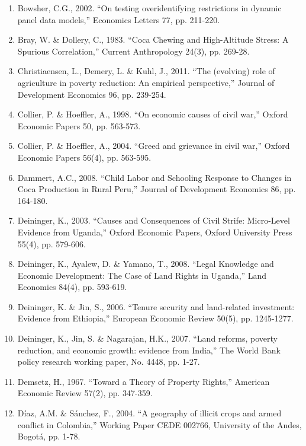\documentclass[12pt,a4paper,english]{article}%
\begin{document}
\begin{enumerate}
\item Bowsher, C.G., 2002. ``On testing overidentifying restrictions in dynamic panel data models,'' Economics Letters 77, pp. 211-220.

\item Bray, W. \& Dollery, C., 1983. ``Coca Chewing and High-Altitude Stress: A Spurious Correlation,'' Current Anthropology 24(3), pp. 269-28.

\item Christiaensen, L., Demery, L. \& Kuhl, J., 2011. ``The (evolving) role of agriculture in poverty reduction: An empirical perspective,'' Journal of Development Economics 96, pp. 239-254.

\item Collier, P. \& Hoeffler, A., 1998. ``On economic causes of civil war,'' Oxford Economic Papers 50, pp. 563-573.

\item Collier, P. \& Hoeffler, A., 2004. ``Greed and grievance in civil war,'' Oxford Economic Papers 56(4), pp. 563-595.

\item Dammert, A.C., 2008. ``Child Labor and Schooling Response to Changes in Coca Production in Rural Peru,'' Journal of Development Economics 86, pp. 164-180.

\item Deininger, K., 2003. ``Causes and Consequences of Civil Strife: Micro-Level Evidence from Uganda,'' Oxford Economic Papers, Oxford University Press 55(4), pp. 579-606.

\item Deininger, K., Ayalew, D. \& Yamano, T., 2008. ``Legal Knowledge and Economic Development: The Case of Land Rights in Uganda,'' Land Economics 84(4), pp. 593-619.

\item Deininger, K. \& Jin, S., 2006. ``Tenure security and land-related investment: Evidence from Ethiopia,'' European Economic Review 50(5), pp. 1245-1277.

\item Deininger, K., Jin, S. \& Nagarajan, H.K., 2007. ``Land reforms, poverty reduction, and economic growth: evidence from India,'' The World Bank policy research working paper, No. 4448, pp. 1-27.

\item Demsetz, H., 1967. ``Toward a Theory of Property Rights,'' American Economic Review 57(2), pp. 347-359.

\item D\'{i}az, A.M. \& S\'{a}nchez, F., 2004. ``A geography of illicit crops and armed conflict in Colombia,'' Working Paper CEDE 002766, University of the Andes, Bogot\'{a}, pp. 1-78.


\end{enumerate}
\end{document}

